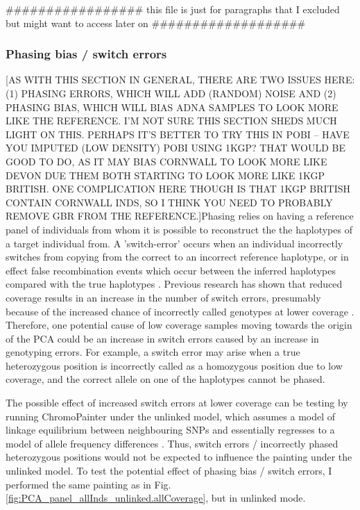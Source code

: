 ################# this file is just for paragraphs that I excluded but might want to access later on ###################

\subsubsection{Phasing bias / switch errors}

{\color{red}[AS WITH THIS SECTION IN GENERAL, THERE ARE TWO ISSUES HERE: (1) PHASING ERRORS, WHICH WILL ADD (RANDOM) NOISE AND (2) PHASING BIAS, WHICH WILL BIAS ADNA SAMPLES TO LOOK MORE LIKE THE REFERENCE. I'M NOT SURE THIS SECTION SHEDS MUCH LIGHT ON THIS. PERHAPS IT'S BETTER TO TRY THIS IN POBI -- HAVE YOU IMPUTED (LOW DENSITY) POBI USING 1KGP? THAT WOULD BE GOOD TO DO, AS IT MAY BIAS CORNWALL TO LOOK MORE LIKE DEVON DUE THEM BOTH STARTING TO LOOK MORE LIKE 1KGP BRITISH. ONE COMPLICATION HERE THOUGH IS THAT 1KGP BRITISH CONTAIN CORNWALL INDS, SO I THINK YOU NEED TO PROBABLY REMOVE GBR FROM THE REFERENCE.]}Phasing relies on having a reference panel of individuals from whom it is possible to reconstruct the the haplotypes of a target individual from. A 'switch-error' occurs when an individual incorrectly switches from copying from the correct to an incorrect reference haplotype, or in effect false recombination events which occur between the inferred haplotypes compared with the true haplotypes \cite{choi2018comparison}. Previous research has shown that reduced coverage results in an increase in the number of switch errors, presumably because of the increased chance of incorrectly called genotypes at lower coverage \cite{rubinacci2021efficient}. Therefore, one potential cause of low coverage samples moving towards the origin of the PCA could be an increase in switch errors caused by an increase in genotyping errors. For example, a switch error may arise when a true heterozygous position is incorrectly called as a homozygous position due to low coverage, and the correct allele on one of the haplotypes cannot be phased. 

The possible effect of increased switch errors at lower coverage can be testing by running ChromoPainter under the unlinked model, which assumes a model of linkage equilibrium between neighbouring SNPs and essentially regresses to a model of allele frequency differences \cite{Lawson2012}. Thus, switch errors / incorrectly phased heterozygous positions would not be expected to influence the painting under the unlinked model. To test the potential effect of phasing  bias / switch errors, I performed the same painting as in Fig. \ref{fig:PCA_panel_allInds_unlinked.allCoverage}, but in unlinked mode. 

